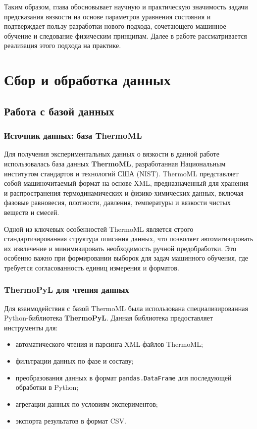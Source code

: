 \documentclass[a4paper,12pt]{article}
\begin{document}
Таким образом, глава обосновывает научную и практическую значимость задачи предсказания вязкости на основе параметров уравнения состояния и подтверждает пользу разработки нового подхода, сочетающего машинное обучение и следование физическим принципам. Далее в работе рассматривается реализация этого подхода на практике.

\newpage

\section{Сбор и обработка данных}
  \subsection{Работа с базой данных}
    \subsubsection{Источник данных: база ThermoML}
    
      Для получения экспериментальных данных о вязкости в данной работе использовалась база данных \textbf{ThermoML}, разработанная Национальным институтом стандартов и технологий США (NIST). ThermoML представляет собой машиночитаемый формат на основе XML, предназначенный для хранения и распространения термодинамических и физико-химических данных, включая фазовые равновесия, плотности, давления, температуры и вязкости чистых веществ и смесей.
      
      Одной из ключевых особенностей ThermoML является строго стандартизированная структура описания данных, что позволяет автоматизировать их извлечение и минимизировать необходимость ручной предобработки. Это особенно важно при формировании выборок для задач машинного обучения, где требуется согласованность единиц измерения и форматов.
      
    \subsubsection{ThermoPyL для чтения данных}
      Для взаимодействия с базой ThermoML была использована специализированная Python-библиотека \textbf{ThermoPyL}. Данная библиотека предоставляет инструменты для:
      \begin{itemize}
        \item автоматического чтения и парсинга XML-файлов ThermoML;
        \item фильтрации данных по фазе и составу;
        \item преобразования данных в формат \texttt{pandas.DataFrame} для последующей обработки в Python;
        \item агрегации данных по условиям экспериментов;
        \item экспорта результатов в формат CSV.
      \end{itemize}
      
\end{document}
